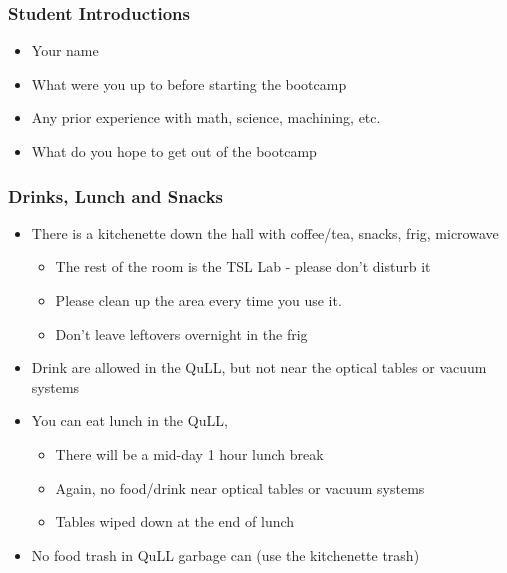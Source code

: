 \documentclass{beamer}
\begin{document}
\begin{frame}\frametitle{Student Introductions}
\begin{itemize}
\item Your name
\item What were you up to before starting the bootcamp
\item Any prior experience with math, science, machining, etc.
\item What do you hope to get out of the bootcamp
\end{itemize}
\end{frame}

\begin{frame}\frametitle{Drinks, Lunch and Snacks}
\begin{itemize}
\item There is a kitchenette down the hall with coffee/tea, snacks, frig, microwave
\begin{itemize}
\item The rest of the room is the TSL Lab - please don't disturb it
\item Please clean up the area every time you use it.
\item Don't leave leftovers overnight in the frig
\end{itemize}
\item Drink are allowed in the QuLL, but not near the optical tables or vacuum systems
\item You can eat lunch in the QuLL, 
\begin{itemize}
\item There will be a mid-day 1 hour lunch break
\item Again, no food/drink near optical tables or vacuum systems
\item Tables wiped down at the end of lunch
\end{itemize}
\item No food trash in QuLL garbage can (use the kitchenette trash)
\end{itemize}
\end{frame}
\end{document}
